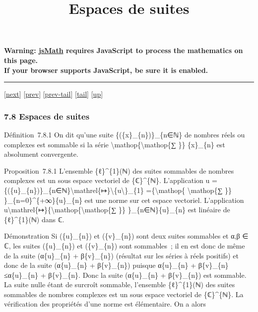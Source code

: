 \documentclass[]{article}
\title{Espaces de suites}
\author{}
\date{}
\begin{document}
\maketitle

\textbf{Warning: \href{http://www.math.union.edu/locate/jsMath}{jsMath}
requires JavaScript to process the mathematics on this page.\\ If your
browser supports JavaScript, be sure it is enabled.}

\begin{center}\rule{3in}{0.4pt}\end{center}

{[}\href{coursse43.html}{next}{]} {[}\href{coursse41.html}{prev}{]}
{[}\href{coursse41.html\#tailcoursse41.html}{prev-tail}{]}
{[}\hyperref[tailcoursse42.html]{tail}{]}
{[}\href{coursch8.html\#coursse42.html}{up}{]}

\subsubsection{7.8 Espaces de suites}

Définition~7.8.1 On dit qu'une suite \{(\{x\}\_\{n\})\}\_\{n∈ℕ\} de
nombres réels ou complexes est sommable si la série
\textbackslash{}mathop\{\textbackslash{}mathop\{∑ \}\} \{x\}\_\{n\} est
absolument convergente.

Proposition~7.8.1 L'ensemble \{ℓ\}\^{}\{1\}(ℕ) des suites sommables de
nombres complexes est un sous espace vectoriel de \{ℂ\}\^{}\{ℕ\}.
L'application u =
\{(\{u\}\_\{n\})\}\_\{n∈ℕ\}\textbackslash{}mathrel\{↦\}\textbackslash{}\textbar{}\{u\textbackslash{}\textbar{}\}\_\{1\}
=\{\textbackslash{}mathop\{ \textbackslash{}mathop\{∑ \}\}
\}\_\{n=0\}\^{}\{+∞\}\textbar{}\{u\}\_\{n\}\textbar{} est une norme sur
cet espace vectoriel. L'application
u\textbackslash{}mathrel\{↦\}\{\textbackslash{}mathop\{\textbackslash{}mathop\{∑
\}\} \}\_\{n∈ℕ\}\{u\}\_\{n\} est linéaire de \{ℓ\}\^{}\{1\}(ℕ) dans ℂ.

Démonstration Si (\{u\}\_\{n\}) et (\{v\}\_\{n\}) sont deux suites
sommables et α,β ∈ ℂ, les suites (\textbar{}\{u\}\_\{n\}\textbar{}) et
(\textbar{}\{v\}\_\{n\}\textbar{}) sont sommables~; il en est donc de
même de la suite (\textbar{}α\textbar{}\textbar{}\{u\}\_\{n\}\textbar{}
+ \textbar{}β\textbar{}\textbar{}\{v\}\_\{n\}\textbar{}) (résultat sur
les séries à réels positifs) et donc de la suite
(\textbar{}α\{u\}\_\{n\} + β\{v\}\_\{n\}\textbar{}) puisque
\textbar{}α\{u\}\_\{n\} +
β\{v\}\_\{n\}\textbar{}≤\textbar{}α\textbar{}\textbar{}\{u\}\_\{n\}\textbar{}
+ \textbar{}β\textbar{}\textbar{}\{v\}\_\{n\}\textbar{}. Donc la suite
(α\{u\}\_\{n\} + β\{v\}\_\{n\}) est sommable. La suite nulle étant de
surcroît sommable, l'ensemble \{ℓ\}\^{}\{1\}(ℕ) des suites sommables de
nombres complexes est un sous espace vectoriel de \{ℂ\}\^{}\{ℕ\}. La
vérification des propriétés d'une norme est élémentaire. On a alors
\end{document}
